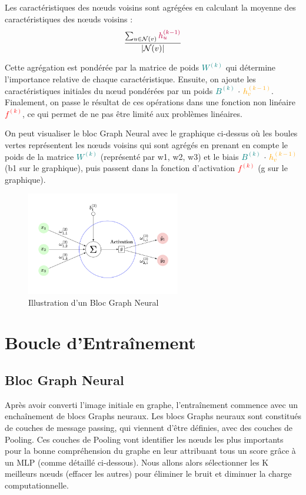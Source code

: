 \documentclass{article}
\begin{document}
Les caractéristiques des nœuds voisins sont agrégées en calculant la moyenne des caractéristiques des nœuds voisins :
\[
\frac{\sum_{u \in \mathcal{N}(v)} \textcolor{purple}{h_u^{(k-1)}}}{|\mathcal{N}(v)|}
\]

Cette agrégation est pondérée par la matrice de poids \textcolor{teal}{$W^{(k)}$} qui détermine l'importance relative de chaque caractéristique. Ensuite, on ajoute les caractéristiques initiales du nœud pondérées par un poids \textcolor{teal}{$B^{(k)}$} \(\cdot\) \textcolor{orange}{$h_v^{(k-1)}$}. Finalement, on passe le résultat de ces opérations dans une fonction non linéaire \textcolor{red}{$f^{(k)}$}, ce qui permet de ne pas être limité aux problèmes linéaires.



On peut visualiser le bloc Graph Neural avec le graphique ci-dessus où les boules vertes représentent les nœuds voisins qui sont agrégés en prenant en compte le poids de la matrice \textcolor{teal}{$W^{(k)}$} (représenté par w1, w2, w3) et le biais \textcolor{teal}{$B^{(k)}$} \(\cdot\) \textcolor{orange}{$h_v^{(k-1)}$} (b1 sur le graphique), puis passent dans la fonction d'activation \textcolor{red}{$f^{(k)}$} (g sur le graphique).

\begin{figure}[h]
    \centering
    \includegraphics[width=0.6\textwidth]{v.png}
    \caption{Illustration d'un Bloc Graph Neural}
    \label{fig:bloc}
\end{figure}

\section{Boucle d’Entraînement}

\subsection{Bloc Graph Neural}
Après avoir converti l'image initiale en graphe, l’entraînement commence avec un enchaînement de blocs Graphs neuraux. Les blocs Graphs neuraux sont constitués de couches de message passing, qui viennent d’être définies, avec des couches de Pooling. Ces couches de Pooling vont identifier les nœuds les plus importants pour la bonne compréhension du graphe en leur attribuant tous un score grâce à un MLP (comme détaillé ci-dessous). Nous allons alors sélectionner les K meilleurs nœuds (effacer les autres) pour éliminer le bruit et diminuer la charge computationnelle.
\end{document}
